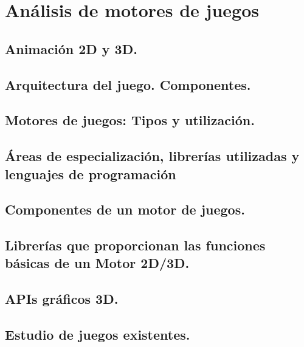 \documentclass[a4paper,12pt,spanish]{sphinxmanual}
\begin{document}
\chapter{Análisis de motores de juegos}
\label{index:analisis-de-motores-de-juegos}

\section{Animación 2D y 3D.}
\label{index:animacion-2d-y-3d}

\section{Arquitectura del juego. Componentes.}
\label{index:arquitectura-del-juego-componentes}

\section{Motores de juegos: Tipos y utilización.}
\label{index:motores-de-juegos-tipos-y-utilizacion}

\section{Áreas de especialización, librerías utilizadas y lenguajes de programación}
\label{index:areas-de-especializacion-librerias-utilizadas-y-lenguajes-de-programacion}

\section{Componentes de un motor de juegos.}
\label{index:componentes-de-un-motor-de-juegos}

\section{Librerías que proporcionan las funciones básicas de un Motor 2D/3D.}
\label{index:librerias-que-proporcionan-las-funciones-basicas-de-un-motor-2d-3d}

\section{APIs gráficos 3D.}
\label{index:apis-graficos-3d}

\section{Estudio de juegos existentes.}
\label{index:estudio-de-juegos-existentes}
\end{document}
